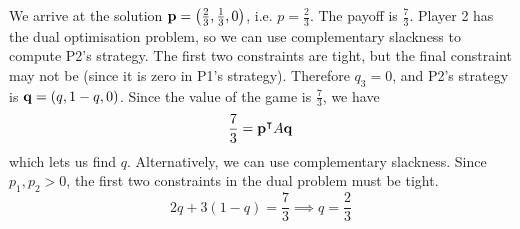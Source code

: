 \begin{example}
	We arrive at the solution \( \vb p = \qty(\frac{2}{3}, \frac{1}{3}, 0) \), i.e.
	\( p = \frac{2}{3} \).
	The payoff is \( \frac{7}{3} \).
	Player 2 has the dual optimisation problem, so we can use complementary slackness to compute P2's strategy.
	The first two constraints are tight, but the final constraint may not be (since it is zero in P1's strategy).
	Therefore \( q_3 = 0 \), and P2's strategy is \( \vb q = (q, 1-q, 0) \).
	Since the value of the game is \( \frac{7}{3} \), we have
	\[
		\frac{7}{3} = \vb p^\intercal A \vb q
	\]
	which lets us find \( q \).
	Alternatively, we can use complementary slackness.
	Since \( p_1, p_2 > 0 \), the first two constraints in the dual problem must be tight.
	\[
		2q + 3(1-q) = \frac{7}{3} \implies q = \frac{2}{3}
	\]
\end{example}
